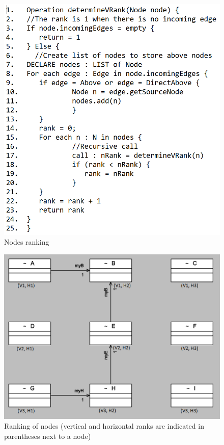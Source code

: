 \begin{figure}
	\includegraphics[width=\linewidth]{ranking.PNG}
	\caption{Nodes ranking}
	\label{fig :ranking}
\end{figure}
\begin{figure}
	\includegraphics[width=1\linewidth]{sample_algorithm2.PNG}
	\caption{Ranking of nodes (vertical and horizontal ranks are indicated in parentheses next to a node)}
	\label{fig :model ranks}
\end{figure}
